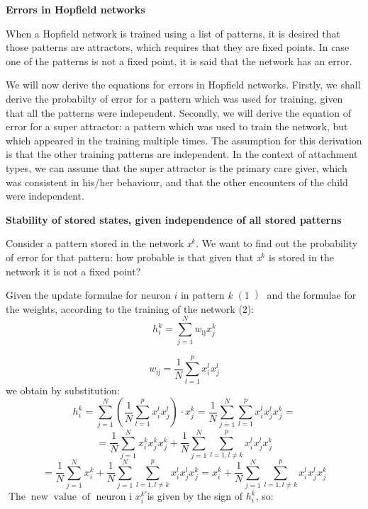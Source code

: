\documentclass{letter}
\newcommand{\nocomma}{}
\newcommand{\noplus}{}
\newcommand{\tmem}[1]{{\em #1\/}}
\newcommand{\tmop}[1]{\ensuremath{\operatorname{#1}}}
\newcommand{\tmtextbf}[1]{{\bfseries{#1}}}
\newcommand{\tmtextit}[1]{{\itshape{#1}}}
\begin{document}
\tmtextbf{Errors in Hopfield networks}

When a Hopfield network is trained using a list of patterns, it is desired
that those patterns are attractors, which requires that they are fixed points.
In case one of the patterns is not a fixed point, it is said that the network
has an error.

{\tmem{}}We will now derive the equations for errors in Hopfield networks.
Firstly, we shall derive the probabilty of error for a pattern which was used
for training, given that all the patterns were independent. Secondly, we will
derive the equation of error for a super attractor: a pattern which was used
to train the network, but which appeared in the training multiple times. The
assumption for this derivation is that the other training patterns are
independent. In the context of attachment types, we can assume that the super
attractor is the primary care giver, which was consistent in his/her
behaviour, and that the other encounters of the child were independent.

\tmtextbf{Stability of stored states, given independence of all stored
patterns}

Consider a pattern stored in the network \tmtextit{x$^k$}. We want to find out
the probability of error for that pattern: how probable is that given that
\tmtextit{x$^k$} is stored in the network it is not a fixed point?

Given the update formulae for neuron $i$ in pattern \tmtextit{k } $\left( 1
\left) \right. \right.$ and the formulae for the weights, according to the
training of the network ($2$):
\[ h_i^k = \sum^N_{j = 1} w_{\tmop{ij}} x_j^k  \]

\begin{equation}
  w_{\tmop{ij}} = \frac{1}{N} \sum^p_{l = 1} x^l_{i^{}} x_j^l
\end{equation}
we obtain by substitution:
\[ h_i^k = \sum^N_{j = 1} \left(^{} \frac{1}{N} \sum^p_{l = 1} x^l_{i^{}}
   x^l_j \right)_{} \cdot x_j^k = \frac{1}{N}  \sum^N_{j = 1} \sum^p_{l = 1}
   x^l_{i^{}} x^l_j x^k_{^{} j} = \]
\[ = \frac{1}{N}  \sum^N_{j = 1}^{} x^k_{i^{}} x^k_j x^k_{^{} j} \noplus
   \noplus + \frac{1}{N}  \sum^N_{j = 1} \sum^p_{l = 1 \nocomma, l \neq k}
   x^l_{i^{}} x^l_j x^k_{^{} j} \]
\[ = \frac{1}{N}  \sum^N_{j = 1}^{} x^k_{i^{}} + \frac{1}{N}  \sum^N_{j = 1}
   \sum^p_{l = 1 \nocomma, l \neq k} x^l_{i^{}} x^l_j x^k_{^{} j} = x^k_{i^{}}
   + \frac{1}{N}  \sum^N_{j = 1} \sum^p_{l = 1 \nocomma, l \neq k} x^l_{i^{}}
   x^l_j x^k_{^{} j} \]
\[  \]
$\tmop{The} \tmop{new} \tmop{value} \tmop{of}$ neuron i $x^{k'}_i $is given by
the sign of $h_i^k $, so:
\end{document}
